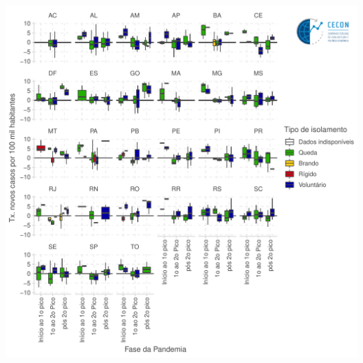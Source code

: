 \documentclass{SelfArx}
\begin{document}
\begin{center}
\includegraphics[width=.9\linewidth]{./figs/COVID/Estados/Boxplot_Isolamento.pdf}
\end{center}
\end{document}
